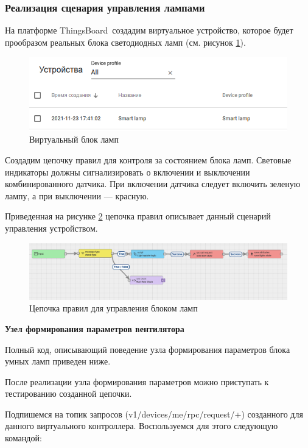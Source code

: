 \documentclass[a4paper,14pt]{extarticle}
\newcommand{\tb}{ThingsBoard~}
\begin{document}
\subsubsection*{Реализация сценария управления лампами}


На платформе \tb создадим виртуальное устройство, которое будет прообразом реальных блока светодиодных ламп (см. рисунок \ref{fig:dev-2}).


\begin{figure}[h!]
	\centering
	\includegraphics[width=0.5\linewidth]{images/dev-2}
	\caption{Виртуальный блок ламп}
	\label{fig:dev-2}
\end{figure}


Создадим цепочку правил для контроля за состоянием блока ламп. Световые индикаторы должны сигнализировать о включении и выключении комбинированного датчика. При включении датчика следует включить зеленую лампу, а при выключении --- красную. 

Приведенная на рисунке \ref{fig:chains-2} цепочка правил описывает данный сценарий управления устройством.
\begin{figure}[h!]
	\centering
	\includegraphics[width=0.6\linewidth]{images/chains-2}
	\caption{Цепочка правил для управления блоком ламп}
	\label{fig:chains-2}
\end{figure}


\textbf{Узел формирования параметров вентилятора}

Полный код, описывающий поведение узла формирования параметров блока умных ламп приведен ниже.




После реализации узла формирования параметров можно приступать к тестированию созданной цепочки. 

Подпишемся на топик запросов (v1/devices/me/rpc/request/+) созданного для данного
виртуального контроллера. Воспользуемся для этого следующую командой:
\end{document}
